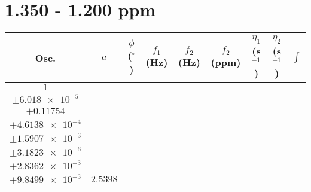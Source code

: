 \documentclass[8pt]{article}
\begin{document}
\section*{1.350 - 1.200 ppm}
\begin{longtable}[l]{c c c c c c c c c}
\toprule
Osc. & $a$ & $\phi$ ($^{\circ}$) & $f_1$ (Hz) & $f_2$ (Hz) & $f_2$ (ppm) & $\eta_1$ (s$^{-1}$) & $\eta_2$ (s$^{-1}$) & $\int$\\
\midrule
$\num{1}$ & \begin{tabular}[c]{@{}c@{}}$\num{2.9839e-2}$ \\ $\pm\num{6.018e-5}$\end{tabular} & \begin{tabular}[c]{@{}c@{}}$\num{-0.14207}$ \\ $\pm\num{0.11754}$\end{tabular} & \begin{tabular}[c]{@{}c@{}}$\num{-8.5035}$ \\ $\pm\num{4.6138e-4}$\end{tabular} & \begin{tabular}[c]{@{}c@{}}$\num{629.19}$ \\ $\pm\num{1.5907e-3}$\end{tabular} & \begin{tabular}[c]{@{}c@{}}$\num{1.2587}$ \\ $\pm\num{3.1823e-6}$\end{tabular} & \begin{tabular}[c]{@{}c@{}}$\num{1.1526}$ \\ $\pm\num{2.8362e-3}$\end{tabular} & \begin{tabular}[c]{@{}c@{}}$\num{4.1954}$ \\ $\pm\num{9.8499e-3}$\end{tabular} & $\num{2.5398}$\\

\end{longtable}
\end{document}
